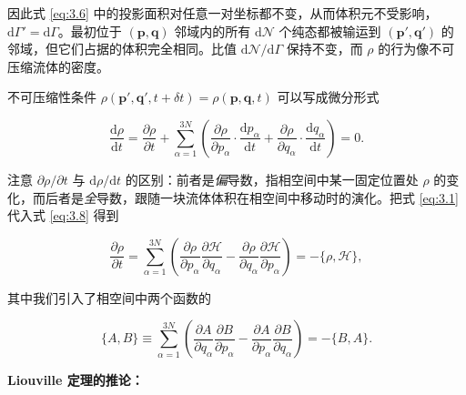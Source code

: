 因此式 \eqref{eq:3.6} 中的投影面积对任意一对坐标都不变，从而体积元不受影响，$\mathrm{d}\Gamma'=\mathrm{d}\Gamma$。最初位于 $(\bm p,\bm q)$ 邻域内的所有 $\mathrm{d}\mathcal{N}$ 个纯态都被输运到 $(\bm p',\bm q')$ 的邻域，但它们占据的体积完全相同。比值 $\mathrm{d}\mathcal{N}/\mathrm{d}\Gamma$ 保持不变，而 $\rho$ 的行为像不可压缩流体的密度。

不可压缩性条件 $\rho(\bm p',\bm q',t+\delta t)=\rho(\bm p,\bm q,t)$ 可以写成微分形式

\begin{equation}\label{eq:3.8}
  \frac{\mathrm{d}\rho}{\mathrm{d}t}=\frac{\partial\rho}{\partial t}+\sum_{\alpha=1}^{3N}\left(\frac{\partial\rho}{\partial p_\alpha}\cdot\frac{\mathrm{d}p_\alpha}{\mathrm{d}t}+\frac{\partial\rho}{\partial q_\alpha}\cdot\frac{\mathrm{d}q_\alpha}{\mathrm{d}t}\right)=0.
\end{equation}

注意 $\partial\rho/\partial t$ 与 $\mathrm{d}\rho/\mathrm{d}t$ 的区别：前者是\emph{偏}导数，指相空间中某一固定位置处 $\rho$ 的变化，而后者是\emph{全}导数，跟随一块流体体积在相空间中移动时的演化。把式 \eqref{eq:3.1} 代入式 \eqref{eq:3.8} 得到

\begin{equation}\label{eq:3.9}
  \frac{\partial\rho}{\partial t}=\sum_{\alpha=1}^{3N}\left(\frac{\partial\rho}{\partial p_\alpha}\frac{\partial\mathscr H}{\partial q_\alpha}-\frac{\partial\rho}{\partial q_\alpha}\frac{\partial\mathscr H}{\partial p_\alpha}\right)=-\{\rho,\mathscr H\},
\end{equation}

其中我们引入了相空间中两个函数的

\begin{equation}\label{eq:3.10}
  \{A,B\}\equiv\sum_{\alpha=1}^{3N}\left(\frac{\partial A}{\partial q_\alpha}\frac{\partial B}{\partial p_\alpha}-\frac{\partial A}{\partial p_\alpha}\frac{\partial B}{\partial q_\alpha}\right)=-\{B,A\}.
\end{equation}

\textbf{Liouville 定理的推论：}

